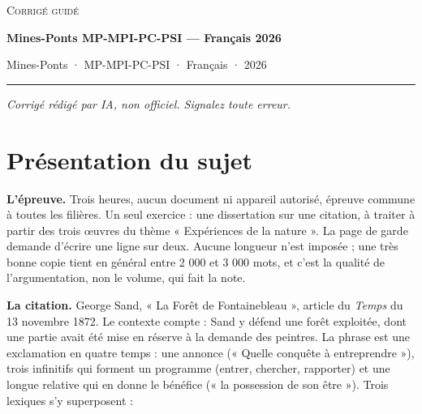 \documentclass[11pt,a4paper]{article}
\begin{document}
\thispagestyle{plain}
\begin{center}
  {\small\scshape Corrigé guidé}\par\smallskip
  {\LARGE\bfseries Mines-Ponts MP-MPI-PC-PSI — Français 2026\par}\medskip
  {\large Mines-Ponts · MP-MPI-PC-PSI · Français · 2026\par}
\end{center}
\vspace{2pt}\hrule\vspace{8pt}

\emph{Corrigé rédigé par IA, non officiel. Signalez toute erreur.}

\hypertarget{pruxe9sentation-du-sujet}{%
\section{Présentation du sujet}\label{pruxe9sentation-du-sujet}}

\textbf{L'épreuve.} Trois heures, aucun document ni appareil autorisé, épreuve commune à toutes les filières. Un seul exercice : une dissertation sur une citation, à traiter à partir des trois œuvres du thème « Expériences de la nature ». La page de garde demande d'écrire une ligne sur deux. Aucune longueur n'est imposée ; une très bonne copie tient en général entre 2 000 et 3 000 mots, et c'est la qualité de l'argumentation, non le volume, qui fait la note.

\textbf{La citation.} George Sand, « La Forêt de Fontainebleau », article du \emph{Temps} du 13 novembre 1872. Le contexte compte : Sand y défend une forêt exploitée, dont une partie avait été mise en réserve à la demande des peintres. La phrase est une exclamation en quatre temps : une annonce (« Quelle conquête à entreprendre »), trois infinitifs qui forment un programme (entrer, chercher, rapporter) et une longue relative qui en donne le bénéfice (« la possession de son être »). Trois lexiques s'y superposent :
\end{document}
